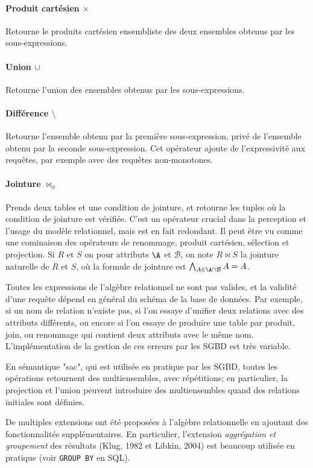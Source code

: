 \documentclass[french, toc]{../cs-classes/cs-classes}
\begin{document}
\paragraph*{Produit cartésien $\times$}
Retourne le produits cartésien ensembliste des deux ensembles obtenus par les sous-expressions.
\paragraph*{Union $\cup$}
Retourne l'union des ensembles obtenus par les sous-expressions.
\paragraph*{Différence $\setminus$}
Retourne l'ensemble obtenu par la première sous-expression, privé de l'ensemble obtenu par la seconde sous-expression. Cet opérateur ajoute de l'expressivité aux requêtes, par exemple avec des requêtes non-monotones.
\paragraph*{Jointure $\bowtie_\phi$}
Prends deux tables et une condition de jointure, et retourne les tuples où la condition de jointure est vérifiée. C'est un opérateur crucial dans la perception et l'usage du modèle relationnel, mais est en fait redondant. Il peut être vu comme une cominaison des opérateurs de renommage, produit cartésien, sélection et projection.
Si $R$ et $S$ on pour attributs $\A$ et $\mathcal{B}$, on note $R\bowtie S$ la jointure naturelle de $R$ et $S$, où la formule de jointure est $\bigwedge_{A\in\A\cap \mathcal{B}}A=A$.

Toutes les expressions de l'algèbre relationnel ne sont pas valides, et la validité d'une requête dépend en général du schéma de la base de données. Par exemple, si un nom de relation n'existe pas, si l'on essaye d'unifier deux relations avec des attributs différents, ou encore si l'on essaye de produire une table par produit, join, ou renommage qui contient deux attributs avec le même nom. L'implémentation de la gestion de ces erreurs par les SGBD est très variable.

En sémantique "sac", qui est utilisée en pratique par les SGBD, toutes les opérations retournent des multiensembles, avec répétitions; en particulier, la projection et l'union peuvent introduire des multiensembles quand des relations initiales sont définies.

De multiples extensions ont été proposées à l'algèbre relationnelle en ajoutant des fonctionnalités supplémentaires. En particulier, l'extension \emph{aggrégation et groupement} des résultats (Klug, 1982 et Libkin, 2004) est beaucoup utilisée en pratique (voir \texttt{GROUP BY} en SQL).
\end{document}
